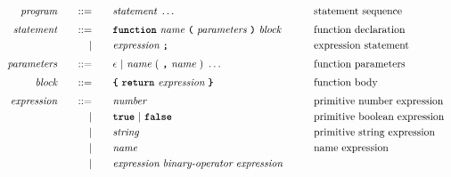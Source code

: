 







\begin{alignat*}{9}
&& \textit{program}    &&\quad ::= &\quad && \textit{statement} \ \ldots
                                                           && \textrm{statement sequence} \\[1mm]
&& \textit{statement}    &&\quad ::= &\quad && \textbf{\texttt{function}}\  \textit{name} \ 
                                   \textbf{\texttt{(}}\  \textit{parameters} \ \textbf{\texttt{)}}\ \textit{block} \quad
                                                           && \textrm{function declaration}\\
&&                       && |   &\quad &&  \textit{expression} \ \textbf{\texttt{;}}
                                                           && \textrm{expression statement} \\[1mm]
&& \textit{parameters}   && ::= &\quad &&  \epsilon\ | \  \textit{name} \ 
                                                   (\ \textbf{\texttt{,}} \ \textit{name}\ )\ \ldots
                                                            && \textrm{function parameters}   \\[1mm]
&& \textit{block}        && ::= &      && \textbf{\texttt{\{}}\  \textbf{\texttt{return}}\ \textit{expression}   \ \textbf{\texttt{\}}} \quad
                                                           && \textrm{function body}\\[1mm]         
&& \textit{expression}   && ::= &\quad &&  \textit{number}   && \textrm{primitive number expression}\\
&&                       && |   &\quad && \textbf{\texttt{true}}\ |\ \textbf{\texttt{false}}
                                                           && \textrm{primitive boolean expression}\\
&&                       && |   &\quad &&  \textit{string}   && \textrm{primitive string expression}\\
&&                       && |   &\quad &&  \textit{name}   && \textrm{name expression}\\
&&                       && |   &\quad &&  \textit{expression} \  \textit{binary-operator} \ 
                                            \textit{expression} \qquad

\end{alignat*}
